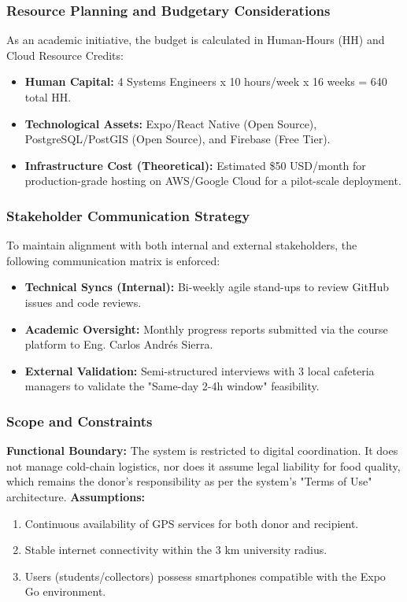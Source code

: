 \documentclass[9pt,conference]{IEEEtran}
\begin{document}
\subsubsection{Resource Planning and Budgetary Considerations}

As an academic initiative, the budget is calculated in Human-Hours (HH) and Cloud Resource Credits:
\begin{itemize}
    \item \textbf{Human Capital:} 4 Systems Engineers x 10 hours/week x 16 weeks = 640 total HH.
    \item \textbf{Technological Assets:} Expo/React Native (Open Source), PostgreSQL/PostGIS (Open Source), and Firebase (Free Tier).
    \item \textbf{Infrastructure Cost (Theoretical):} Estimated \$50 USD/month for production-grade hosting on AWS/Google Cloud for a pilot-scale deployment.
\end{itemize}

\subsubsection{Stakeholder Communication Strategy}To maintain alignment with both internal and external stakeholders, the following communication matrix is enforced:
\begin{itemize}
    \item \textbf{Technical Syncs (Internal):} Bi-weekly agile stand-ups to review GitHub issues and code reviews.
    \item \textbf{Academic Oversight:} Monthly progress reports submitted via the course platform to Eng. Carlos Andrés Sierra.
    \item \textbf{External Validation:} Semi-structured interviews with 3 local cafeteria managers to validate the "Same-day 2-4h window" feasibility.
\end{itemize}

\subsubsection{Scope and Constraints}
\textbf{Functional Boundary:} The system is restricted to digital coordination. It does not manage cold-chain logistics, nor does it assume legal liability for food quality, which remains the donor's responsibility as per the system's "Terms of Use" architecture.
\textbf{Assumptions:}
\begin{enumerate}
    \item Continuous availability of GPS services for both donor and recipient.
    \item Stable internet connectivity within the 3 km university radius.
    \item Users (students/collectors) possess smartphones compatible with the Expo Go environment.
\end{enumerate}
\end{document}
